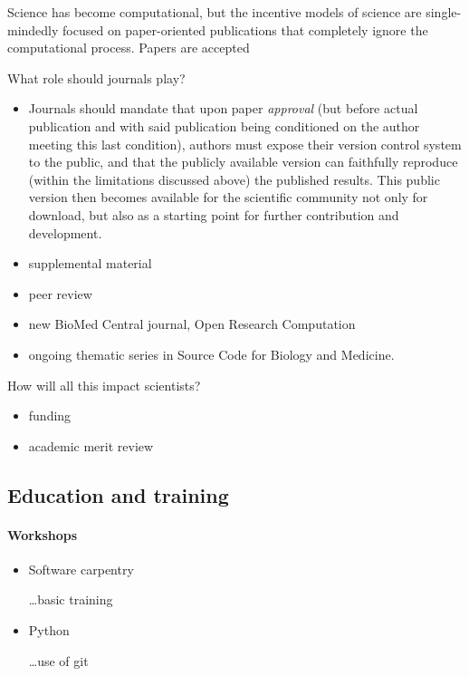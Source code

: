 \documentclass[ChapterTOCs,krantz2]{krantz} %
\begin{document}
Science has become computational, but the incentive models of science
are single-mindedly focused on paper-oriented publications that completely
ignore the computational process. Papers are accepted 

What role should journals play?

\begin{itemize}
\item Journals should mandate that upon paper \emph{approval} (but before
actual publication and with said publication being conditioned on
the author meeting this last condition), authors must expose their
version control system to the public, and that the publicly available
version can faithfully reproduce (within the limitations discussed
above) the published results. This public version then becomes available
for the scientific community not only for download, but also as a
starting point for further contribution and development.

\item supplemental material

\item peer review

\item new BioMed Central journal, Open Research Computation

 \item ongoing thematic series in Source Code for Biology and Medicine.
\cite{neylon2012changing}

\end{itemize}

How will all this impact scientists?

\begin{itemize}

\item funding
\item academic merit review

\end{itemize}

\subsection{Education and training}

\paragraph{ {\bf Workshops}}

\begin{itemize}

\item Software carpentry

\ldots basic training

\item Python

\ldots use of git

\end{itemize}
\end{document}
